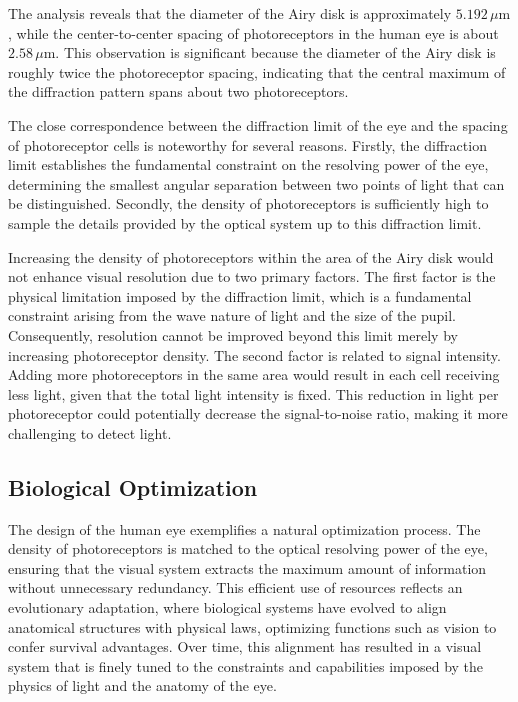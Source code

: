 \documentclass[
  a4paper,
]{book}
\begin{document}
\begin{tcolorbox}[enhanced jigsaw, breakable, toptitle=1mm, bottomrule=.15mm, colbacktitle=quarto-callout-note-color!10!white, title=\textcolor{quarto-callout-note-color}{\faInfo}\hspace{0.5em}{Analysis of the Results}, arc=.35mm, rightrule=.15mm, bottomtitle=1mm, opacityback=0, toprule=.15mm, coltitle=black, leftrule=.75mm, opacitybacktitle=0.6, colback=white, left=2mm, titlerule=0mm, colframe=quarto-callout-note-color-frame]

The analysis reveals that the diameter of the Airy disk is approximately
\(5.192\, \mu\text{m}\), while the center-to-center spacing of
photoreceptors in the human eye is about \(2.58\, \mu\text{m}\). This
observation is significant because the diameter of the Airy disk is
roughly twice the photoreceptor spacing, indicating that the central
maximum of the diffraction pattern spans about two photoreceptors.

The close correspondence between the diffraction limit of the eye and
the spacing of photoreceptor cells is noteworthy for several reasons.
Firstly, the diffraction limit establishes the fundamental constraint on
the resolving power of the eye, determining the smallest angular
separation between two points of light that can be distinguished.
Secondly, the density of photoreceptors is sufficiently high to sample
the details provided by the optical system up to this diffraction limit.

Increasing the density of photoreceptors within the area of the Airy
disk would not enhance visual resolution due to two primary factors. The
first factor is the physical limitation imposed by the diffraction
limit, which is a fundamental constraint arising from the wave nature of
light and the size of the pupil. Consequently, resolution cannot be
improved beyond this limit merely by increasing photoreceptor density.
The second factor is related to signal intensity. Adding more
photoreceptors in the same area would result in each cell receiving less
light, given that the total light intensity is fixed. This reduction in
light per photoreceptor could potentially decrease the signal-to-noise
ratio, making it more challenging to detect light.

\subsection{Biological Optimization}\label{biological-optimization}

The design of the human eye exemplifies a natural optimization process.
The density of photoreceptors is matched to the optical resolving power
of the eye, ensuring that the visual system extracts the maximum amount
of information without unnecessary redundancy. This efficient use of
resources reflects an evolutionary adaptation, where biological systems
have evolved to align anatomical structures with physical laws,
optimizing functions such as vision to confer survival advantages. Over
time, this alignment has resulted in a visual system that is finely
tuned to the constraints and capabilities imposed by the physics of
light and the anatomy of the eye.


\end{tcolorbox}
\end{document}

